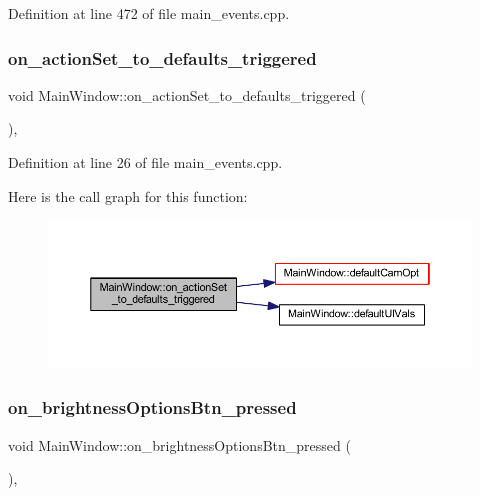 Definition at line 472 of file main\+\_\+events.\+cpp.

\mbox{\label{classMainWindow_a3292a73fad4dfd479598ea5166e293c9}} 
\subsubsection{\texorpdfstring{on\_actionSet\_to\_defaults\_triggered}{on\_actionSet\_to\_defaults\_triggered}}
{\footnotesize\ttfamily void Main\+Window\+::on\+\_\+action\+Set\+\_\+to\+\_\+defaults\+\_\+triggered (\begin{DoxyParamCaption}{ }\end{DoxyParamCaption})\hspace{0.3cm}{\ttfamily [private]}, {\ttfamily [slot]}}



Definition at line 26 of file main\+\_\+events.\+cpp.

Here is the call graph for this function\+:
\nopagebreak
\begin{figure}[H]
\begin{center}
\leavevmode
\includegraphics[width=350pt]{classMainWindow_a3292a73fad4dfd479598ea5166e293c9_cgraph}
\end{center}
\end{figure}
\mbox{\label{classMainWindow_a8b3a042f694a5013ad5e65253bc3a0ae}} 
\subsubsection{\texorpdfstring{on\_brightnessOptionsBtn\_pressed}{on\_brightnessOptionsBtn\_pressed}}
{\footnotesize\ttfamily void Main\+Window\+::on\+\_\+brightness\+Options\+Btn\+\_\+pressed (\begin{DoxyParamCaption}{ }\end{DoxyParamCaption})\hspace{0.3cm}{\ttfamily [private]}, {\ttfamily [slot]}}



